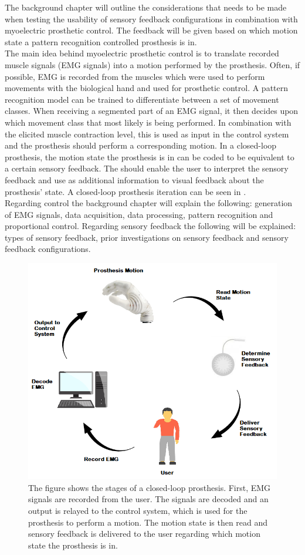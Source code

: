 The background chapter will outline the considerations that needs to be made when testing the usability of sensory feedback configurations in combination with myoelectric prosthetic control. The feedback will be given based on which motion state a pattern recognition controlled prosthesis is in. \\ 
The main idea behind myoelectric prosthetic control is to translate recorded muscle signals (EMG signals) into a motion performed by the prosthesis. Often, if possible, EMG is recorded from the muscles which were used to perform movements with the biological hand and used for prosthetic control. A pattern recognition model can be trained to differentiate between a set of movement classes. When receiving a segmented part of an EMG signal, it then decides upon which movement class that most likely is being performed. In combination with the elicited muscle contraction level, this is used as input in the control system and the prosthesis should perform a corresponding motion. \cite{Guanglin2010} In a closed-loop prosthesis, the motion state the prosthesis is in can be coded to be equivalent to a certain sensory feedback. The should enable the user to interpret the sensory feedback and use as additional information to visual feedback about the prosthesis' state. \cite{Strbac2016} A closed-loop prosthesis iteration can be seen in . \\
Regarding control the background chapter will explain the following: generation of EMG signals, data acquisition, data processing, pattern recognition and proportional control. Regarding sensory feedback the following will be explained: types of sensory feedback, prior investigations on sensory feedback and sensory feedback configurations. 

\begin{figure}[H]                 
	\includegraphics[width=.65\textwidth]{figures/closed_loop_pros}  
	\caption{The figure shows the stages of a closed-loop prosthesis. First, EMG signals are recorded from the user. The signals are decoded and an output is relayed to the control system, which is used for the prosthesis to perform a motion. The motion state is then read and sensory feedback is delivered to the user regarding which motion state the prosthesis is in.}
	\label{fig:closed_loop_pros} 
\end{figure}
